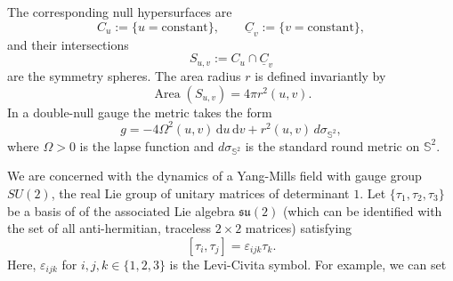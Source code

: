 \documentclass{article}[11pt]
\numberwithin{equation}{section}
\begin{document}
\noindent The corresponding null hypersurfaces are
\[
C_u:=\{u=\mathrm{constant}\},
\qquad
\underline C_v:=\{v=\mathrm{constant}\},
\]
and their intersections
\[
S_{u,v}:=C_u\cap\underline C_v
\]
are the symmetry spheres. The area radius \(r\) is defined invariantly by
\begin{equation}
    \operatorname{Area}(S_{u,v})=4\pi r^2(u,v).
\end{equation}
In a double-null gauge the metric takes the form
\begin{equation}
    g=-4\Omega^2(u,v)\,\mathrm du\,\mathrm dv
      +r^2(u,v)\,d\sigma_{\mathbb S^2},
    \label{eq:intro-double-null-metric}
\end{equation}
where \(\Omega>0\) is the lapse function and \(d\sigma_{\mathbb S^2}\) is the standard round
metric on \(\mathbb S^2\).

\vspace{3mm}

 \noindent We are concerned with the dynamics of a Yang-Mills field with gauge group $SU(2)$, the real Lie group of unitary matrices of determinant $1$. 
\noindent Let \(\{\tau_1,\tau_2,\tau_3\}\) be a basis of of the associated Lie algebra 
\(\mathfrak{su}(2)\) (which can be identified with the set of all anti-hermitian, traceless $2\times 2$ matrices) satisfying
\[
    [\tau_i,\tau_j]=\varepsilon_{ijk}\tau_k.
\]Here, $\varepsilon_{ijk}$ for $i,j,k \in \{1,2,3\}$ is the Levi-Civita symbol. For example, we can set
\end{document}
